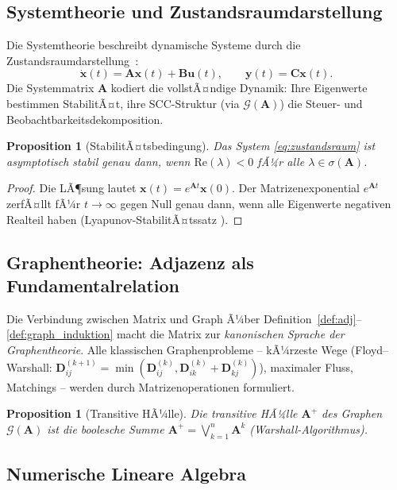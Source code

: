 ﻿\documentclass[12pt, a4paper]{article}
\newtheorem{proposition}[theorem]{Proposition}
\theoremstyle{definition}
\theoremstyle{remark}
\newcommand{\vx}{\bm{x}}
\newcommand{\vu}{\bm{u}}
\newcommand{\vy}{\bm{y}}
\newcommand{\vA}{\bm{A}}
\newcommand{\vB}{\bm{B}}
\newcommand{\vC}{\bm{C}}
\newcommand{\vD}{\bm{D}}
\newcommand{\spec}{\sigma}
\newcommand{\re}{\mathrm{Re}}
\begin{document}
\subsection{Systemtheorie und Zustandsraumdarstellung}
\label{subsec:system}

Die Systemtheorie beschreibt dynamische Systeme durch die
Zustandsraumdarstellung~\citep{epp2026sysstate}:
\begin{equation}
  \dot{\vx}(t) = \vA\vx(t) + \vB\vu(t), \qquad \vy(t) = \vC\vx(t).
  \label{eq:zustandsraum}
\end{equation}
Die Systemmatrix $\vA$ kodiert die vollstÃ¤ndige Dynamik: Ihre Eigenwerte
bestimmen StabilitÃ¤t, ihre SCC-Struktur (via $\mathcal{G}(\vA)$) die
Steuer- und Beobachtbarkeitsdekomposition.

\begin{proposition}[StabilitÃ¤tsbedingung]
Das System \eqref{eq:zustandsraum} ist asymptotisch stabil genau dann,
wenn $\re(\lambda) < 0$ fÃ¼r alle $\lambda \in \spec(\vA)$.
\end{proposition}

\begin{proof}
Die LÃ¶sung lautet $\vx(t) = e^{\vA t}\vx(0)$. Der Matrizenexponential
$e^{\vA t}$ zerfÃ¤llt fÃ¼r $t \to \infty$ gegen Null genau dann, wenn alle
Eigenwerte negativen Realteil haben (Lyapunov-StabilitÃ¤tssatz
\citep{lyapunov1892,khalil2002}).
\end{proof}

\subsection{Graphentheorie: Adjazenz als Fundamentalrelation}
\label{subsec:graph_anw}

Die Verbindung zwischen Matrix und Graph Ã¼ber
Definition~\ref{def:adj}--\ref{def:graph_induktion} macht die Matrix zur
\emph{kanonischen Sprache der Graphentheorie}. Alle klassischen
Graphenprobleme -- kÃ¼rzeste Wege (Floyd--Warshall: $\vD^{(k+1)}_{ij} =
\min(\vD^{(k)}_{ij}, \vD^{(k)}_{ik} + \vD^{(k)}_{kj})$),
maximaler Fluss, Matchings -- werden durch Matrizenoperationen formuliert.

\begin{proposition}[Transitive HÃ¼lle]
Die \emph{transitive HÃ¼lle} $\vA^+$ des Graphen $\mathcal{G}(\vA)$ ist
die boolesche Summe $\vA^+ = \bigvee_{k=1}^n \vA^k$ (Warshall-Algorithmus).
\end{proposition}

\subsection{Numerische Lineare Algebra}
\label{subsec:numerik}
\end{document}
